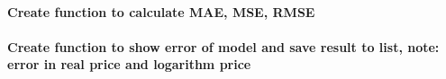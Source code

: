 \documentclass[
]{article}
\begin{document}
\hypertarget{create-function-to-calculate-mae-mse-rmse}{%
\paragraph{Create function to calculate MAE, MSE,
RMSE}\label{create-function-to-calculate-mae-mse-rmse}}

\hypertarget{create-function-to-show-error-of-model-and-save-result-to-list-note-error-in-real-price-and-logarithm-price}{%
\paragraph{Create function to show error of model and save result to
list, note: error in real price and logarithm
price}\label{create-function-to-show-error-of-model-and-save-result-to-list-note-error-in-real-price-and-logarithm-price}}
\end{document}
